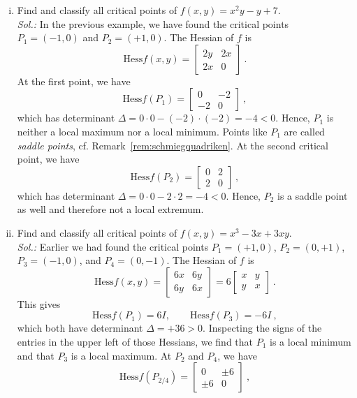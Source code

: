 \begin{example}
\label{expl:classifications}
\begin{enumerate}[(i)]
	\item Find and classify all critical points of $f(x,y) = x^2y - y + 7$.\\
	{\it Sol.:} In the previous example, we have found the critical points $P_1=(-1,0)$ and $P_2=(+1,0)$. The Hessian of $f$ is
	\[ \mathrm{Hess}f(x,y) =
	\begin{bmatrix}	2y & 2x \\ 2x & 0 \end{bmatrix} \:. \]
	At the first point, we have
	\[ \mathrm{Hess}f(P_1) =
	\begin{bmatrix}	0 & -2 \\ -2 & 0 \end{bmatrix} \:, \]
	which has determinant $\Delta = 0 \cdot 0 - (-2) \cdot (-2) = -4 < 0$. Hence, $P_1$ is neither a local maximum nor a local minimum. Points like $P_1$ are called \emph{saddle points}, cf. Remark~\ref{rem:schmiegquadriken}.
	At the second critical point, we have
	\[ \mathrm{Hess}f(P_2) =
	\begin{bmatrix}	0 & 2 \\ 2 & 0 \end{bmatrix} \:, \]
	which has determinant $\Delta = 0 \cdot 0 - 2 \cdot 2 = -4 < 0$. Hence, $P_2$ is a saddle point as well and therefore not a local extremum.
	\item Find and classify all critical points of $f(x,y) = x^3 - 3x + 3xy$.\\
	{\it Sol.:} Earlier we had found the critical points $P_1=(+1,0)$, $P_2=(0,+1)$, $P_3=(-1,0)$, and $P_4=(0,-1)$. The Hessian of $f$ is
	\[ \mathrm{Hess}f(x,y) =
	\begin{bmatrix}	6x & 6y \\ 6y & 6x \end{bmatrix} = 
	6\begin{bmatrix}	x & y \\ y & x \end{bmatrix} \:. \]
	This gives
	\[ \mathrm{Hess}f(P_1) = 6 I, \qquad \mathrm{Hess}f(P_3) = -6 I \:, \]
	which both have determinant $\Delta = +36 > 0$. Inspecting the signs of the entries in the upper left of those Hessians, we find that $P_1$ is a local minimum and that $P_3$ is a local maximum. At $P_2$ and $P_4$, we have
	\[ \mathrm{Hess}f(P_{2/4}) =
	\begin{bmatrix}	 0 & \pm6 \\ \pm6 & 0 \end{bmatrix} \:, \]

\end{enumerate}
\end{example}
